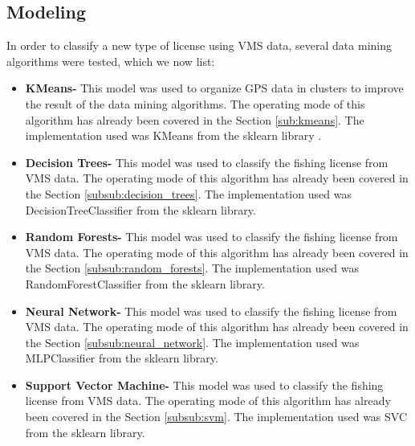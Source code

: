 \newpage
\subsection{Modeling} %
\label{sub:modeling}
In order to classify a new type of license using VMS data, several data mining algorithms were tested, which we now list:
\begin{itemize}
\item \textbf{ KMeans-} This model was used to organize GPS data in clusters to improve the result of the data mining algorithms. The operating mode of this algorithm has already been covered in the Section \ref{sub:kmeans}.
The implementation used was KMeans from the sklearn library \cite{WEBSITE:scikit}.

\item \textbf{ Decision Trees- } This model was used to classify the fishing license from VMS data. The operating mode of this algorithm has already been covered in the Section \ref{subsub:decision_trees}. The implementation used was DecisionTreeClassifier from the sklearn library.


\item \textbf{ Random Forests- } This model was used to classify the fishing license from VMS data. The operating mode of this algorithm has already been covered in the Section \ref{subsub:random_forests}. The implementation used was RandomForestClassifier from the sklearn library.


\item \textbf{Neural Network- } This model was used to classify the fishing license from VMS data. The operating mode of this algorithm has already been covered in the Section \ref{subsub:neural_network}. The implementation used was MLPClassifier from the sklearn library.

\item \textbf{Support Vector Machine- } This model was used to classify the fishing license from VMS data. The operating mode of this algorithm has already been covered in the Section \ref {subsub:svm}. The implementation used was SVC from the sklearn library.
\end{itemize}



